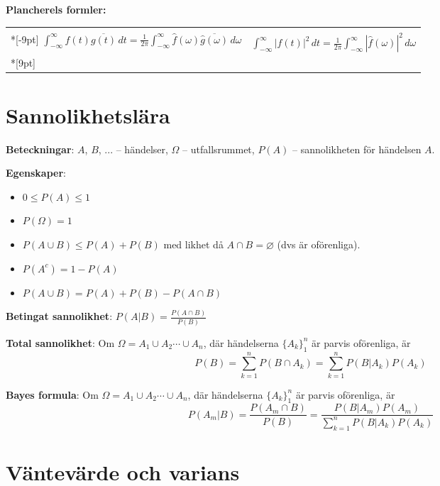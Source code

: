 \documentclass{article}
\begin{document}
\medskip\textbf{Plancherels formler:}
\begin{tabular}[m]{|l|l|}
  \hline
 & \\*[-9pt]
$
\int_{-\infty}^\infty f(t)\overline{g(t)}\,dt
= \frac1{2\pi}\int_{-\infty}^\infty \widehat f(\omega)\overline{\widehat g(\omega)}\,d\omega
$
&
$
\int_{-\infty}^\infty |f(t)|^2\,dt
= \frac1{2\pi}\int_{-\infty}^\infty |\widehat f(\omega)|^2\,d\omega
$
\\*[9pt]
  \hline
\end{tabular}


\section*{Sannolikhetslära}%

\textbf{Beteckningar}: $A$, $B$, ... -- händelser, $\Omega$ -- utfallsrummet, 
   $P(A)$ -- sannolikheten för händelsen $A$.

\textbf{Egenskaper}:
\parbox[m]{0.8\hsize}{
\begin{itemize}\advance\itemsep by -5pt
  \item $0\le P(A)\le 1$
  \item $P(\Omega)=1$
  \item $P(A\cup B)\le P(A)+P(B)$ med likhet då $A\cap B=\varnothing$ 
     (dvs är oförenliga).
  \item $P(A^c) = 1-P(A)$
  \item $P(A\cup B) = P(A)+P(B)-P(A\cap B)$
\end{itemize}
}

\textbf{Betingat sannolikhet}: $P(A|B) = \frac{P(A\cap B)}{P(B)}$

\textbf{Total sannolikhet}: 
Om  $\Omega=A_1\cup A_2\cdots\cup A_n$, där 
händelserna $\{A_k\}_1^n$ är parvis oförenliga, är
\[
P(B) = \sum_{k=1}^n P(B\cap A_k) 
     = \sum_{k=1}^n P(B|A_k) P(A_k) 
\]

\textbf{Bayes formula}: 
Om $\Omega=A_1\cup A_2\cdots\cup A_n$, där 
händelserna $\{A_k\}_1^n$ är parvis oförenliga, är
$$
P(A_m|B) = \frac{P(A_m\cap B)}{P(B)}
      = \frac{P(B|A_m) P(A_m)} 
             {\sum_{k=1}^n P(B|A_k) P(A_k)} 
$$%

\section*{Väntevärde och varians}%
\end{document}

